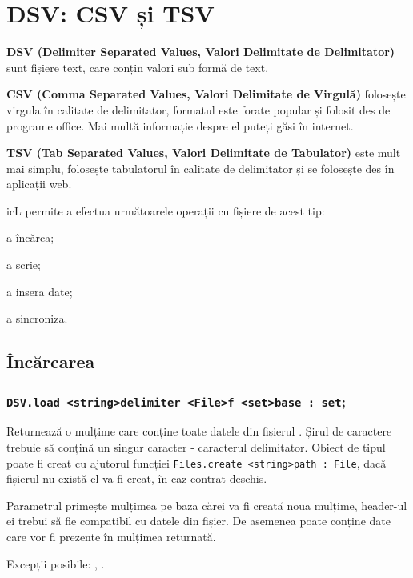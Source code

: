 \section{DSV: CSV și TSV}

{\bf DSV (Delimiter Separated Values, Valori Delimitate de Delimitator)} sunt fișiere text, care conțin valori sub formă de text.

{\bf CSV (Comma Separated Values, Valori Delimitate de Virgulă)} folosește virgula în calitate de delimitator, formatul este forate popular și folosit des de programe office. Mai multă informație despre el puteți găsi în internet.

{\bf TSV (Tab Separated Values, Valori Delimitate de Tabulator)} este mult mai simplu, folosește tabulatorul în calitate de delimitator și se folosește des în aplicații web.

icL permite a efectua următoarele operații cu fișiere de acest tip:
\begin{icItems}
	\item a încărca;
	\item a scrie;
	\item a insera date;
	\item a sincroniza.
\end{icItems}

\subsection{Încărcarea}

\subsubsection{\lstinline|DSV.load <string>delimiter <File>f <set>base : set|;}

Returnează o mulțime care conține toate datele din fișierul . Șirul de caractere  trebuie să conțină un singur caracter - caracterul delimitator. Obiect de tipul  poate fi creat cu ajutorul funcției \lstinline|Files.create <string>path : File|, dacă fișierul nu există el va fi creat, în caz contrat deschis.

Parametrul  primește mulțimea pe baza cărei va fi creată noua mulțime, header-ul ei trebui să fie compatibil cu datele din fișier. De asemenea poate conține date care vor fi prezente în mulțimea returnată.

Excepții posibile: , .

